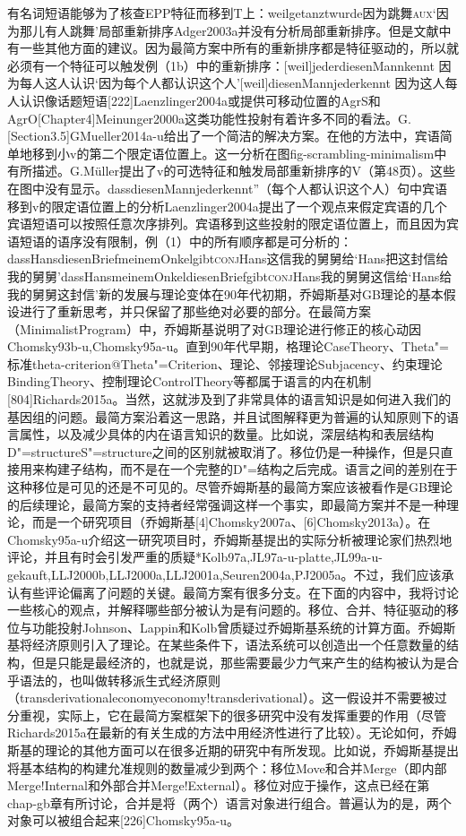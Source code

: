 有名词短语能够为了核查EPP特征而移到T上：weilgetanztwurde因为跳舞\textsc{aux}`因为那儿有人跳舞'局部重新排序Adger2003a并没有分析局部重新排序。但是文献中有一些其他方面的建议。因为最简方案中所有的重新排序都是特征驱动的，所以就必须有一个特征可以触发例（1b）中的重新排序：[weil]jederdiesenMannkennt	因为每人这人认识`因为每个人都认识这个人'[weil]diesenMannjederkennt	因为这人每人认识像话题短语[222]Laenzlinger2004a或提供可移动位置的AgrS和AgrO[Chapter4]Meinunger2000a这类功能性投射有着许多不同的看法。G.[Section3.5]GMueller2014a-u给出了一个简洁的解决方案。在他的方法中，宾语简单地移到小v的第二个限定语位置上。这一分析在图fig-scrambling-minimalism中有所描述。G.Müller提出了v的可选特征和触发局部重新排序的V（第48页）。这些在图中没有显示。dassdiesenMannjederkennt”（每个人都认识这个人）句中宾语移到v的限定语位置上的分析Laenzlinger2004a提出了一个观点来假定宾语的几个宾语短语可以按照任意次序排列。宾语移到这些投射的限定语位置上，而且因为宾语短语的语序没有限制，例（1）中的所有顺序都是可分析的：dassHansdiesenBriefmeinemOnkelgibt\textsc{conj}Hans这信我的舅舅给`Hans把这封信给我的舅舅'dassHansmeinemOnkeldiesenBriefgibt\textsc{conj}Hans我的舅舅这信给`Hans给我的舅舅这封信'新的发展与理论变体在90年代初期，乔姆斯基对GB理论的基本假设进行了重新思考，并只保留了那些绝对必要的部分。在最简方案（MinimalistProgram）中，乔姆斯基说明了对GB理论进行修正的核心动因Chomsky93b-u,Chomsky95a-u。直到90年代早期，格理论CaseTheory、Theta"=标准theta-criterion@Theta"=Criterion、理论、邻接理论Subjacency、约束理论BindingTheory、控制理论ControlTheory等都属于语言的内在机制[804]Richards2015a。当然，这就涉及到了非常具体的语言知识是如何进入我们的基因组的问题。最简方案沿着这一思路，并且试图解释更为普遍的认知原则下的语言属性，以及减少具体的内在语言知识的数量。比如说，深层结构和表层结构D"=structureS"=structure之间的区别就被取消了。移位仍是一种操作，但是只直接用来构建子结构，而不是在一个完整的D"=结构之后完成。语言之间的差别在于这种移位是可见的还是不可见的。尽管乔姆斯基的最简方案应该被看作是GB理论的后续理论，最简方案的支持者经常强调这样一个事实，即最简方案并不是一种理论，而是一个研究项目（乔姆斯基[4]Chomsky2007a、[6]Chomsky2013a）。在Chomsky95a-u介绍这一研究项目时，乔姆斯基提出的实际分析被理论家们热烈地评论，并且有时会引发严重的质疑*Kolb97a,JL97a-u-platte,JL99a-u-gekauft,LLJ2000b,LLJ2000a,LLJ2001a,Seuren2004a,PJ2005a。不过，我们应该承认有些评论偏离了问题的关键。最简方案有很多分支。在下面的内容中，我将讨论一些核心的观点，并解释哪些部分被认为是有问题的。移位、合并、特征驱动的移位与功能投射Johnson、Lappin和Kolb曾质疑过乔姆斯基系统的计算方面。乔姆斯基将经济原则引入了理论。在某些条件下，语法系统可以创造出一个任意数量的结构，但是只能是最经济的，也就是说，那些需要最少力气来产生的结构被认为是合乎语法的，也叫做转移派生式经济原则（transderivationaleconomyeconomy!transderivational）。这一假设并不需要被过分重视，实际上，它在最简方案框架下的很多研究中没有发挥重要的作用（尽管Richards2015a在最新的有关生成的方法中用经济性进行了比较）。无论如何，乔姆斯基的理论的其他方面可以在很多近期的研究中有所发现。比如说，乔姆斯基提出将基本结构的构建允准规则的数量减少到两个：移位Move和合并Merge（即内部Merge!Internal和外部合并Merge!External）。移位对应于操作，这点已经在第chap-gb章有所讨论，合并是将（两个）语言对象进行组合。普遍认为的是，两个对象可以被组合起来[226]Chomsky95a-u。
